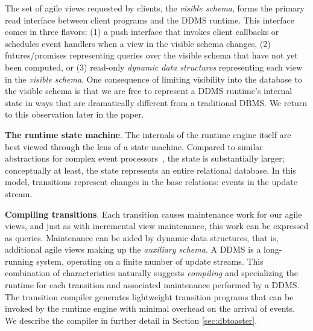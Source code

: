 The set of agile views requested by clients, the \textit{visible schema}, forms
the primary read interface between client programs and the DDMS runtime. This
interface comes in three flavors: (1) a push interface that invokes client
callbacks or schedules event handlers when a view in the visible schema changes,
(2) futures/promises representing queries over the visible schema that have not
yet been computed, or (3) read-only \textit{dynamic data structures}
representing each view in the \textit{visible schema}.  One consequence of
limiting visibility into the database to the visible schema is that we are free
to represent a DDMS runtime's internal state in ways that are dramatically
different from a traditional DBMS.  We return to this observation later in the
paper.






{\bf The runtime state machine}\/.
The internals of the runtime engine itself are best viewed through the lens of a
state machine.  Compared to similar abstractions for complex event
processors~\cite{agrawal-sigmod:08, demers-sigmod:07}, the state is
substantially larger; conceptually at least, the state represents an entire
relational database.  In this model, transitions represent changes in the base
relations: events in the update stream.



{\bf Compiling transitions}\/.
Each transition causes maintenance work for our agile views, and just as
with incremental view maintenance, this work can be expressed as queries.
Maintenance can be aided by dynamic data structures, that is, additional agile
views making up the \textit{auxiliary schema}.
A DDMS is a long-running system, operating on a finite number of update streams.
This combination of characteristics naturally suggests \textit{compiling} and
specializing the runtime for each transition and associated maintenance
performed by a DDMS. The transition compiler generates lightweight transition
programs that can be invoked by the runtime engine with minimal overhead on the
arrival of events. We describe the compiler in further detail in Section
\ref{sec:dbtoaster}.









